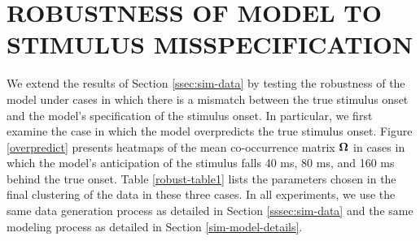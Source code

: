 \documentclass[twoside]{article}
\begin{document}
\section{ROBUSTNESS OF MODEL TO STIMULUS MISSPECIFICATION} \label{sim-robust}
We extend the results of Section \ref{ssec:sim-data} by testing the robustness of the model under cases in which there is a mismatch between the true stimulus onset and the model's specification of the stimulus onset.  In particular, we first examine the case in which the model overpredicts the true stimulus onset.  Figure \ref{overpredict} presents heatmaps of the mean co-occurrence matrix $\boldsymbol{\Omega}$ in cases in which the model's anticipation of the stimulus falls 40 ms, 80 ms, and 160 ms behind the true onset.  Table \ref{robust-table1} lists the parameters chosen in the final clustering of the data in these three cases.  In all experiments, we use the same data generation process as detailed in Section \ref{sssec:sim-data} and the same modeling process as detailed in Section \ref{sim-model-details}.  
\end{document}
